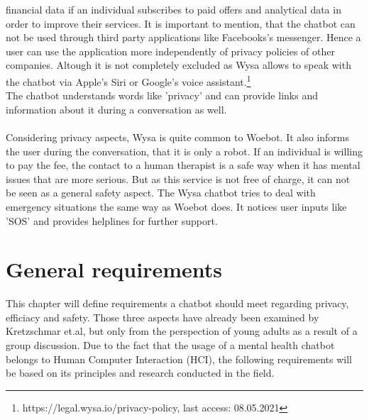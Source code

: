 \documentclass[sigconf, nonacm]{acmart}
\begin{document}
financial data if an individual subscribes to paid offers and analytical data in order to improve their services. 
It is important to mention, that the chatbot can not be used through third party applications like Facebooks's messenger. Hence a user can use the application more independently of privacy policies of other companies. Altough it is not completely excluded as Wysa allows to speak with the chatbot 
via Apple's Siri or Google's voice assistant.\footnote{https://legal.wysa.io/privacy-policy, last access: 08.05.2021}
\\
The chatbot understands words like 'privacy' and can provide links and information about it during a conversation as well.\cite{Kretzschmar2019}
\\\\
Considering privacy aspects, Wysa is quite common to Woebot. It also informs the user during the conversation, that it is only a robot. If an individual is willing to pay the fee, the contact to a human therapist is a safe way when it has mental issues that are 
more serious. But as this service is not free of charge, it can not be seen as a general safety aspect. The Wysa chatbot tries to deal with emergency situations the same way as Woebot does. It notices user inputs like 'SOS' and provides helplines for further support.\cite{Kretzschmar2019}
\section{General requirements}
This chapter will define requirements a chatbot should meet regarding privacy, efficiacy and safety. Those three aspects have already been examined by Kretzschmar et.al, but only from the perspection of young adults as a result of a group discussion\cite{Kretzschmar2019}.
Due to the fact that the usage of a mental health chatbot belongs to Human Computer Interaction (HCI), the following requirements will be based on its principles and research conducted in the field.
\end{document}
